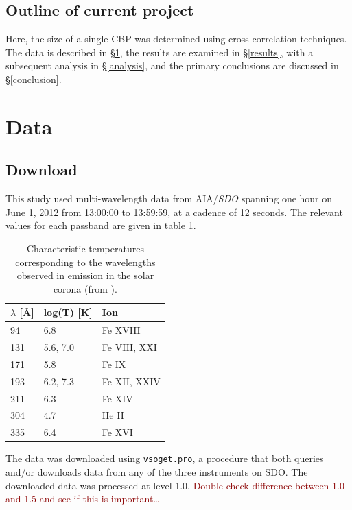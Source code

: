 \documentclass[preprint]{aastex}   %
\begin{document}
\subsection{Outline of current project}
Here, the size of a single CBP was determined using cross-correlation techniques.
The data is described in \S{}\ref{data},
the results are examined in \S{}\ref{results},
with a subsequent analysis in \S{}\ref{analysis},
and the primary conclusions are discussed in \S{}\ref{conclusion}.


\section{Data}\label{data}

\subsection{Download}

This study used
multi-wavelength data from AIA/\textit{SDO}
spanning one hour on June 1, 2012 from 13:00:00 to 13:59:59, at a cadence of 12
seconds.
The relevant values for each passband are given in table \ref{temps}.

\begin{table}[h]
\centering
    \begin{tabular}{l l l}
        \hline\hline
        $\lambda$ [\AA{}] & log(T) [K] & Ion \\
        \hline
        94 & 6.8 & Fe {\small XVIII} \\
        131 & 5.6, 7.0 & Fe {\small VIII, XXI} \\
        171 & 5.8 & Fe {\small IX} \\
        193 & 6.2, 7.3 & Fe {\small XII, XXIV} \\
        211 & 6.3 & Fe {\small XIV} \\
        304 & 4.7 & He {\small II} \\
        335 & 6.4 & Fe {\small XVI} \\
    \end{tabular}
\caption{Characteristic temperatures corresponding to the wavelengths observed
    in emission in the solar corona (from \cite{Lemen}).}
\label{temps}
\end{table}

The data was downloaded using \verb|vsoget.pro|, a procedure that
both queries and/or downloads data from any of the three instruments on SDO.
The downloaded data was processed at level 1.0.
\textcolor{darkred}{Double check difference between 1.0 and 1.5 and see if this
is important\ldots}
\end{document}
